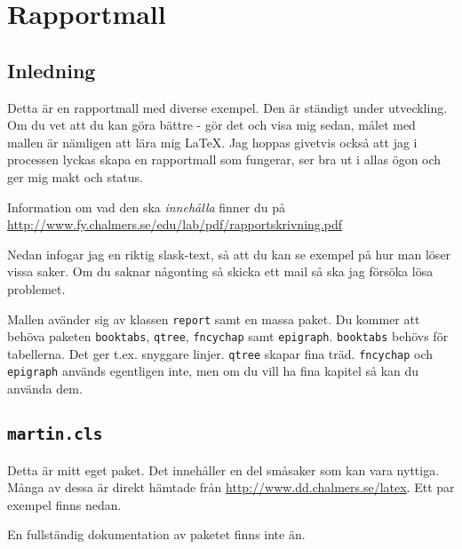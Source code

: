 \section{Rapportmall}
\label{sec:rapportmall}

\subsection{Inledning}
\label{subsec:inledning}

Detta är en rapportmall med diverse exempel. Den är ständigt under
utveckling. Om du vet att du kan göra bättre - gör det och visa mig
sedan, målet med mallen är nämligen att lära mig \LaTeX. Jag hoppas
givetvis också att jag i processen lyckas skapa en rapportmall som
fungerar, ser bra ut i allas ögon och ger mig makt och status.

Information om vad den ska \emph{innehålla} finner du på \url{http://www.fy.chalmers.se/edu/lab/pdf/rapportskrivning.pdf}

Nedan infogar jag en riktig slask-text, så att du kan se exempel på
hur man löser vissa saker. Om du saknar någonting så skicka ett mail
så ska jag försöka lösa problemet.

Mallen avänder sig av klassen \texttt{report} samt en massa paket. Du
kommer att behöva paketen \texttt{booktabs}, \texttt{qtree},
\texttt{fncychap} samt \texttt{epigraph}. \texttt{booktabs} behövs för
tabellerna. Det ger t.ex. snyggare linjer. \texttt{qtree} skapar fina
träd. \texttt{fncychap} och \texttt{epigraph} används egentligen inte, men om du vill ha
fina kapitel så kan du använda dem.

\subsection{\texttt{martin.cls}}
\label{subsec:paketet}

Detta är mitt eget paket. Det innehåller en del småsaker som kan vara
nyttiga. Många av dessa är direkt hämtade från
\url{http://www.dd.chalmers.se/latex}. Ett par exempel finns nedan.

En fullständig dokumentation av paketet finns inte än.